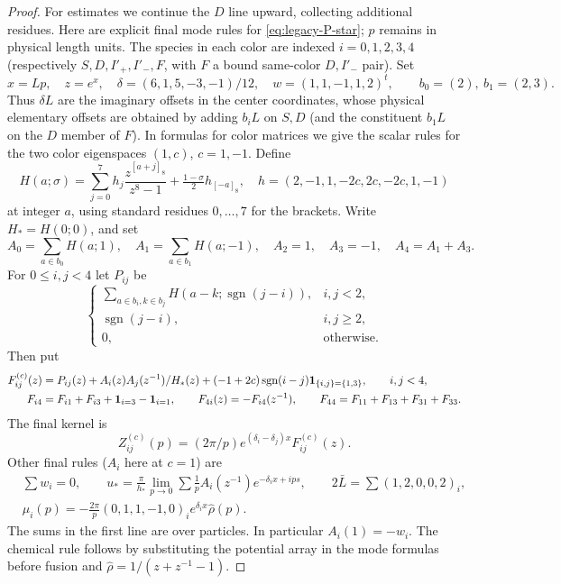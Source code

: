 \begin{proof}
For estimates we continue the \(D\) line upward, collecting additional residues. Here are explicit final mode rules for \eqref{eq:legacy-P-star}; \(p\) remains in physical length units. The species in each color are indexed \(i=0,1,2,3,4\) (respectively \(S,D,I'_+,I'_-,F\), with \(F\) a bound same-color \(D,I'_-\) pair). Set
\[
 x=Lp,\quad z=e^x,\quad
 \delta=(6,1,5,-3,-1)/12,\quad w=(1,1,-1,1,2)^t,\qquad b_0=(2),\ b_1=(2,3).
\]
Thus \(\delta L\) are the imaginary offsets in the center coordinates, whose physical elementary offsets are obtained by adding \(b_i L\) on \(S,D\) (and the constituent \(b_1L\) on the \(D\) member of \(F\)). In formulas for color matrices we give the scalar rules for the two color eigenspaces \((1,c)\), \(c=1,-1\). Define
\[
 H(a;\sigma)=\sum_{j=0}^7 h_j\frac{z^{[a+j]_8}}{z^8-1}+\tfrac{1-\sigma}{2}h_{[-a]_8},
 \quad h=(2,-1,1,-2c,2c,-2c,1,-1)
\]
at integer \(a\), using standard residues \(0,\ldots,7\) for the brackets. Write \(H_*=H(0;0)\), and set
\[
 A_0=\sum_{a\in b_0}H(a;1),\quad A_1=\sum_{a\in b_1}H(a;-1),
 \quad A_2=1,\quad A_3=-1,\quad A_4=A_1+A_3 .
\]
For \(0\le i,j<4\) let \(P_{ij}\) be
\[
 \begin{cases}\displaystyle\sum_{a\in b_i,k\in b_j}H(a-k;\operatorname{sgn}(j-i)),& i,j<2,\\
 \operatorname{sgn}(j-i),&i,j\ge2,\\0,&\text{otherwise}.\end{cases}
\]
Then put
\[
 \begin{split}
 F_{ij}^{(c)}(z)&=P_{ij}(z)+A_i(z)A_j(z^{-1})/H_*(z)
 +(-1+2c)\operatorname{sgn}(i-j){\bf1}_{\{i,j\}=\{1,3\}},\qquad i,j<4,\\
 F_{i4}&=F_{i1}+F_{i3}+{\bf1}_{i=3}-{\bf1}_{i=1},\qquad
 F_{4i}(z)=-F_{i4}(z^{-1}),\qquad F_{44}=F_{11}+F_{13}+F_{31}+F_{33}.
 \end{split}
\]
The final kernel is
\begin{equation}\label{eq:gas-final-kernel}
 Z^{(c)}_{ij}(p)=(2\pi/p)e^{(\delta_i-\delta_j)x}F^{(c)}_{ij}(z).
\end{equation}
Other final rules (\(A_i\) here at \(c=1\)) are
\begin{equation}\label{eq:gas-final-rules}
 \begin{split}
 &\sum w_i=0,\qquad
 u_*=\frac{\pi}{h_*}\lim_{p\to0}\sum \frac1p A_i(z^{-1})e^{-\delta_i x+i p s},\qquad
 2\bar L=\sum (1,2,0,0,2)_i,\\
 &\mu_i(p)=-\frac{2\pi}{p} (0,1,1,-1,0)_i e^{\delta_i x}\widehat\rho(p).
 \end{split}
\end{equation}
The sums in the first line are over particles. In particular \(A_i(1)=-w_i\). The chemical rule follows by substituting the potential array in the mode formulas before fusion and \(\widehat\rho=1/(z+z^{-1}-1)\).


\end{proof}
